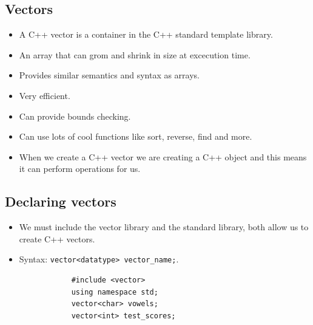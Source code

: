 \subsection{Vectors}
\begin{itemize}
    \item A C++ vector is a container in the C++ standard template library.
    \item An array that can grom and shrink in size at excecution time.
    \item Provides similar semantics and syntax as arrays.
    \item Very efficient.
    \item Can provide bounds checking.
    \item Can use lots of cool functions like sort, reverse, find and more.
    \item When we create a C++ vector we are creating a C++ object and this means it can perform operations for us.
\end{itemize}

\subsection{Declaring vectors}
\begin{itemize}
    \item We must include the vector library and the standard library, both allow us to create C++ vectors. 
    \item Syntax: \verb|vector<datatype> vector_name;|.
        \begin{verbatim}
            #include <vector> 
            using namespace std;
            vector<char> vowels;
            vector<int> test_scores;
        \end{verbatim}
\end{itemize}

